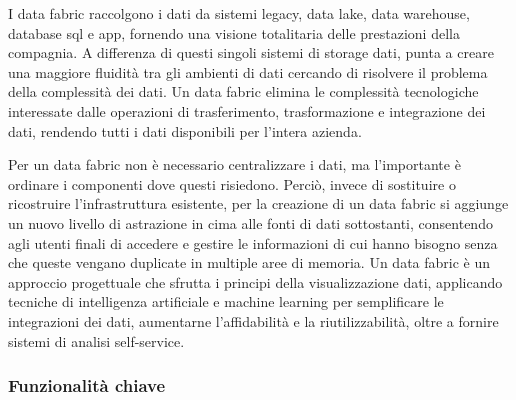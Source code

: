 I data fabric raccolgono i dati da sistemi legacy, data lake, data warehouse, database sql e app, fornendo una visione totalitaria delle prestazioni della compagnia. A differenza di questi singoli sistemi di storage dati, punta a creare una maggiore fluidità tra gli ambienti di dati cercando di risolvere il problema della complessità dei dati. Un data fabric elimina le complessità tecnologiche interessate dalle operazioni di trasferimento, trasformazione e integrazione dei dati, rendendo tutti i dati disponibili per l’intera azienda.\cite{ibm_data_fabric}

Per un data fabric non è necessario centralizzare i dati, ma l’importante è ordinare i componenti dove questi risiedono. Perciò, invece di sostituire o ricostruire l’infrastruttura esistente, per la creazione di un data fabric si aggiunge un nuovo livello di astrazione in cima alle fonti di dati sottostanti, consentendo agli utenti finali di accedere e gestire le informazioni di cui hanno bisogno senza che queste vengano duplicate in multiple aree di memoria. Un data fabric è un approccio progettuale che sfrutta i principi della visualizzazione dati, applicando tecniche di intelligenza artificiale e machine learning per semplificare le integrazioni dei dati, aumentarne l’affidabilità e la riutilizzabilità, oltre a fornire sistemi di analisi self-service.\cite{altexsoft_data_fabric}

\subsubsection{Funzionalità chiave}

